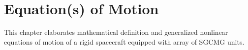 \chapter{Equation(s) of Motion}
\label{chap:2}
This chapter elaborates mathematical definition and generalized nonlinear equations of motion of a rigid spacecraft equipped with array of SGCMG units.


\clearpage

